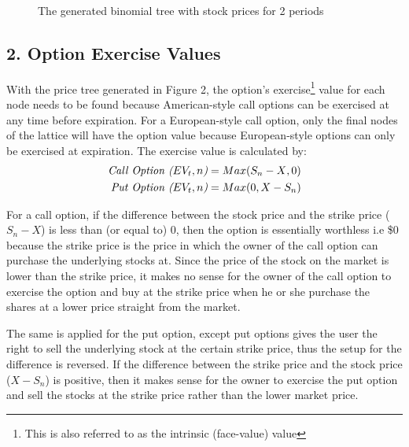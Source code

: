 \documentclass[12pt, letterpaper]{article}
\begin{document}
\begin{figure}[H]
  \caption{The generated binomial tree with stock prices for 2 periods}
\end{figure}


\subsection*{2. Option Exercise Values}
With the price tree generated in Figure 2, the option's exercise\footnote{This is also referred to as the intrinsic (face-value) value} value for each node needs to be found because American-style call options can be exercised at any time before expiration.
For a European-style call option, only the final nodes of the lattice will have the option value because European-style options can only be exercised at expiration. 
The exercise value is calculated \cite{bopmwikipedia} by:
\begin{eqnarray*}
  \text{\textit{Call Option (${EV_t,n}$)}} = Max({S_n - X}, 0) \\
  \text{\textit{Put Option (${EV_t,n}$)}} = Max(0, {X - S_n}) 
\end{eqnarray*}

For a call option, if the difference between the stock price and the strike price (${S_n - X}$) is less than (or equal to) 0, then the option is essentially worthless i.e \$0 because the strike price is the price in which the owner of the call option can purchase the underlying stocks at.
Since the price of the stock on the market is lower than the strike price, it makes no sense for the owner of the call option to exercise the option and buy at the strike price when he or she purchase the shares at a lower price straight from the market.

\medskip

The same is applied for the put option, except put options gives the user the right to sell the underlying stock at the certain strike price, thus the setup for the difference is reversed.
If the difference between the strike price and the stock price (${X - S_n}$) is positive, then it makes sense for the owner to exercise the put option and sell the stocks at the strike price rather than the lower market price.
\end{document}
